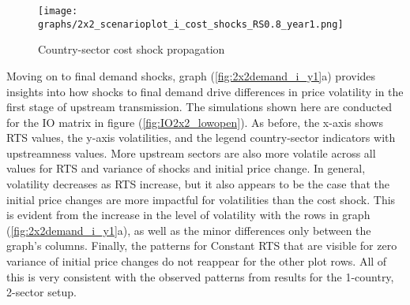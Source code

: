 \begin{figure}[H]
    \texttt{[image: graphs/2x2\_scenarioplot\_i\_cost\_shocks\_RS0.8\_year1.png]}
    \caption{\label{fig:2x2cost_i_y1} Country-sector cost shock propagation}
\end{figure}

Moving on to final demand shocks, graph (\ref{fig:2x2demand_i_y1}a) provides insights into how shocks to final demand drive differences in 
price volatility in the first stage of upstream transmission. The simulations shown here are conducted for the IO 
matrix in figure (\ref{fig:IO2x2_lowopen}). As before, the x-axis shows RTS values, the y-axis volatilities, and the legend country-sector
indicators with upstreamness values. More upstream sectors are also more volatile across all values 
for RTS and variance of shocks and initial price change. In general, volatility decreases as RTS increase, but 
it also appears to be the case that the initial price changes are more impactful for volatilities than the cost shock. This is 
evident from the increase in the level of volatility with the rows in graph (\ref{fig:2x2demand_i_y1}a), as well as the minor differences 
only between the graph's columns. Finally, the patterns for Constant RTS that are visible for zero variance of initial 
price changes do not reappear for the other plot rows. All of this is very consistent with the observed patterns from results for the 
1-country, 2-sector setup.

